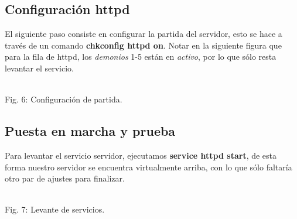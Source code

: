 \documentclass[11pt]{article}
\begin{document}
\subsection{Configuración httpd}
El siguiente paso consiste en configurar la partida del servidor, esto se hace a través de un comando \textbf{chkconfig httpd on}. Notar en la siguiente figura que para la fila de httpd, los \textit{demonios} 1-5 están en \textit{activo}, por lo que sólo resta levantar el servicio.\\

\begin{minipage}[t]{\linewidth}
    \raggedright
\medskip
     \\Fig. 6: Configuración de partida.\\
\end{minipage}
\newpage

\subsection{Puesta en marcha y prueba}
Para levantar el servicio servidor, ejecutamos \textbf{service httpd start}, de esta forma nuestro servidor se encuentra virtualmente arriba, con lo que sólo faltaría otro par de ajustes para finalizar.\\

\begin{minipage}[t]{\linewidth}
    \raggedright
\medskip
     \\Fig. 7: Levante de servicios.\\
\end{minipage}
\end{document}
